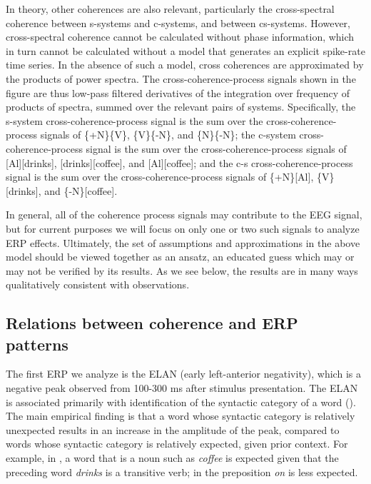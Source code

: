   In theory, other coherences are also relevant, particularly the cross-spectral coherence between s-systems and c-systems, and between cs-systems. However, cross-spectral coherence cannot be calculated without phase information, which in turn cannot be calculated without a model that generates an explicit spike-rate time series. In the absence of such a model, cross coherences are approximated by the products of power spectra. The cross-coherence-process signals shown in the figure are thus low-pass filtered derivatives of the integration over frequency of products of spectra, summed over the relevant pairs of systems. Specifically, the s-system cross-coherence-process signal is the sum over the cross-coherence-process signals of \{+N\}\{V\}, \{V\}\{-N\}, and \{N\}\{-N\}; the c-system cross-coherence-process signal is the sum over the cross-coherence-process signals of [Al][drinks], [drinks][coffee], and [Al][coffee]; and the c-s cross-coherence-process signal is the sum over the cross-coherence-process signals of \{+N\}[Al], \{V\}[drinks], and \{-N\}[coffee]. 

In general, all of the coherence process signals may contribute to the EEG signal, but for current purposes we will focus on only one or two such signals to analyze ERP effects. Ultimately, the set of assumptions and approximations in the above model should be viewed together as an ansatz, an educated guess which may or may not be verified by its results. As we see below, the results are in many ways qualitatively consistent with observations.

\subsection{Relations between coherence and ERP patterns}

The first ERP we analyze is the ELAN (early left-anterior negativity), which is a negative peak observed from 100-300 ms after stimulus presentation. The ELAN is associated primarily with identification of the syntactic category of a word (\citealt{Friederici2002,HahneFriederici1999,SteinhauerDrury2012}). The main empirical finding is that a word whose syntactic category is relatively unexpected results in an increase in the amplitude of the peak, compared to words whose syntactic category is relatively expected, given prior context. For example, in , a word that is a noun such as \textit{coffee} is expected given that the preceding word \textit{drinks} is a transitive verb; in  the preposition \textit{on} is less expected.

